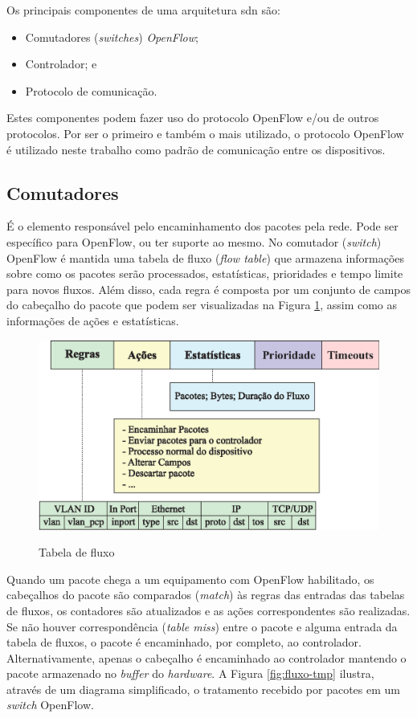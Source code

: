 Os principais componentes de uma arquitetura \gls{sdn} são:
\begin{itemize}
    \item Comutadores (\textit{switches}) \textit{OpenFlow};
    \item Controlador; e
    \item Protocolo de comunicação.
\end{itemize}
Estes componentes podem fazer uso do protocolo OpenFlow e/ou de outros protocolos. Por ser o primeiro e também o mais utilizado, o protocolo OpenFlow é utilizado neste trabalho como padrão de comunicação entre os dispositivos.


\subsection{Comutadores}
\label{subsec:comutador}

É o elemento responsável pelo encaminhamento dos pacotes pela rede. Pode ser específico para OpenFlow, ou ter suporte ao mesmo. No comutador (\textit{switch}) OpenFlow é mantida uma tabela de fluxo (\textit{flow table}) que armazena informações sobre como os pacotes serão processados, estatísticas, prioridades e tempo limite para novos fluxos. Além disso, cada regra é composta por um conjunto de campos do cabeçalho do pacote que podem ser visualizadas na Figura \ref{fig:flow-table}, assim como as informações de ações e estatísticas.

\begin{figure}[H]
  \centering
  \caption{Tabela de fluxo}
  \includegraphics[width=.65\textwidth]{images/flow-table.eps}
  \label{fig:flow-table}
\end{figure}
\FloatBarrier
Quando um pacote chega a um equipamento com OpenFlow habilitado, os cabeçalhos do pacote são comparados (\textit{match}) às regras das entradas das tabelas de fluxos, os contadores são atualizados e as ações correspondentes são realizadas. Se não houver correspondência  (\textit{table miss}) entre o pacote e alguma entrada da tabela de fluxos, o pacote é encaminhado, por completo, ao controlador. Alternativamente, apenas o cabeçalho é encaminhado ao controlador mantendo o pacote armazenado no \textit{buffer} do \textit{hardware}. A Figura \ref{fig:fluxo-tmp} ilustra, através de um diagrama simplificado, o tratamento recebido por pacotes em um \textit{switch} OpenFlow.

